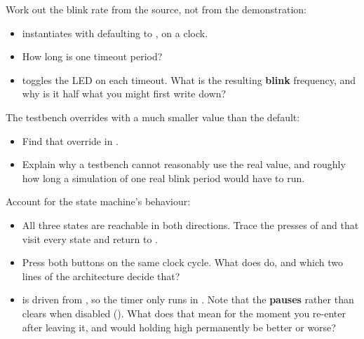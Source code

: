 \begin{parts}
  \item Work out the blink rate from the source, not from the demonstration:
    \begin{itemize}
      \item {} instantiates  with  defaulting to
        , on a  clock.
      \item How long is one timeout period?
      \item {} toggles the LED on each timeout. What is the resulting
        \textbf{blink} frequency, and why is it half what you might first write down?
    \end{itemize}
  \item The testbench overrides  with a much smaller value than the default:
    \begin{itemize}
      \item Find that override in .
      \item Explain why a testbench cannot reasonably use the real value, and roughly how long a
        simulation of one real blink period would have to run.
    \end{itemize}
  \item Account for the state machine's behaviour:
    \begin{itemize}
      \item All three states are reachable in both directions. Trace the presses of
         and  that visit every state and return to
        .
      \item Press both buttons on the same clock cycle. What does  do, and which two
        lines of the architecture decide that?
      \item {} is driven from , so the timer only runs in
        . Note that the  \textbf{pauses} rather than clears when
        disabled (). What does that mean for the moment you re-enter
         after leaving it, and would holding  high permanently
        be better or worse?
    \end{itemize}
\end{parts}

\label{c8:set:5}

